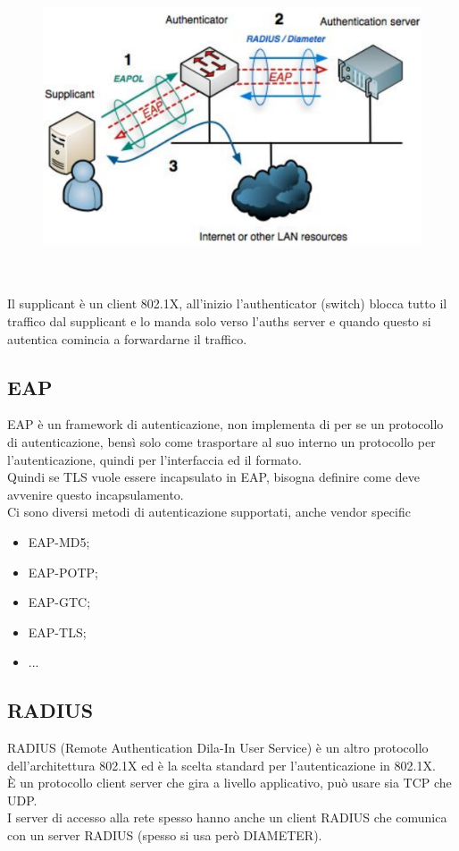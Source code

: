 \documentclass[12pt, oneside]{extbook} %
\begin{document}
    \begin{figure}[h!]
        \centering
        \includegraphics[scale=0.4]{../../immagini/eapol_scheme}
    \end{figure}\\\\
Il supplicant è un client 802.1X, all'inizio l'authenticator (switch) blocca tutto il traffico dal supplicant e lo manda solo verso l'auths server e quando questo si autentica comincia a forwardarne il traffico.

\subsection{EAP}
EAP è un framework di autenticazione, non implementa di per se un protocollo di autenticazione, bensì solo come trasportare al suo interno un protocollo per l'autenticazione, quindi per l'interfaccia ed il formato.
\\Quindi se TLS vuole essere incapsulato in EAP, bisogna definire come deve avvenire questo incapsulamento.
\\Ci sono diversi metodi di autenticazione supportati, anche vendor specific
\begin{itemize}
    \item EAP-MD5;
    \item EAP-POTP;
    \item EAP-GTC;
    \item EAP-TLS;
    \item ...
\end{itemize}

\subsection{RADIUS}
RADIUS (Remote Authentication Dila-In User Service) è un altro protocollo dell'architettura 802.1X ed è la scelta standard per l'autenticazione in 802.1X.
\\È un protocollo client server che gira a livello applicativo, può usare sia TCP che UDP.
\\I server di accesso alla rete spesso hanno anche un client RADIUS che comunica con un server RADIUS (spesso si usa però DIAMETER).
\end{document}
